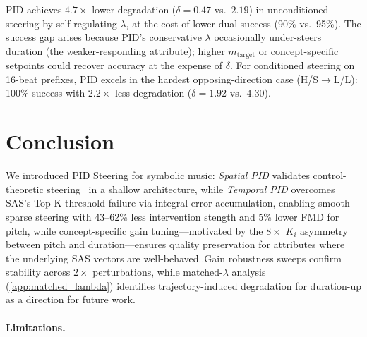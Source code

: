 \documentclass{article}
\theoremstyle{plain}
\begin{document}
PID achieves $4.7{\times}$ lower degradation ($\delta{=}0.47$ vs.\ $2.19$) in unconditioned steering by self-regulating $\lambda$, at the cost of lower dual success (90\% vs.\ 95\%). The success gap arises because PID's conservative $\lambda$ occasionally under-steers duration (the weaker-responding attribute); higher $m_\text{target}$ or concept-specific setpoints could recover accuracy at the expense of $\delta$. For conditioned steering on 16-beat prefixes, PID excels in the hardest opposing-direction case (H/S$\to$L/L): 100\% success with $2.2{\times}$ less degradation ($\delta{=}1.92$ vs.\ $4.30$).

\section{Conclusion}
\label{sec:conclusion}

We introduced PID Steering for symbolic music: \emph{Spatial PID} validates control-theoretic steering~\cite{nguyen2026pid} in a shallow architecture, while \emph{Temporal PID} overcomes SAS's Top-K threshold failure via integral error accumulation, enabling smooth sparse steering with 43--62\% less intervention stength and 5\% lower FMD for pitch, while concept-specific gain tuning---motivated by the $8{\times}$ $K_i$ asymmetry between pitch and duration---ensures quality preservation for attributes where the underlying SAS vectors are well-behaved..Gain robustness sweeps confirm stability across $2{\times}$ perturbations, while matched-$\lambda$ analysis (\cref{app:matched_lambda}) identifies trajectory-induced degradation for duration-up as a direction for future work.

\paragraph{Limitations.}
\end{document}
